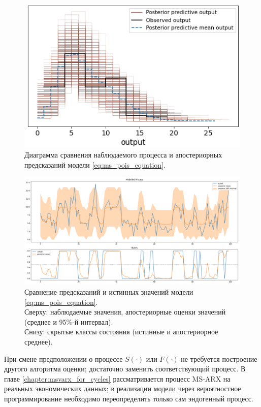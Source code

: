 \documentclass[a4paper,14pt]{extreport}
\begin{document}
\begin{figure}[H]
	\includegraphics[width=\linewidth]{img/gen/pp_ms_pois_ppc.png}
	\caption{
		Диаграмма сравнения наблюдаемого процесса и апостериорных предсказаний модели \eqref{eq:ms_pois_equation}.
	}
	\label{fig:pp_ms_pois_ppc}
\end{figure}

\begin{figure}[H]
	\includegraphics[width=\linewidth]{img/gen/pp_ms_pois_fit.png}
	\caption{Сравнение предсказаний и истинных значений модели \eqref{eq:ms_pois_equation}. \\
		Сверху: наблюдаемые значения, апостериорные оценки значений (среднее и 95\%-й интервал). \\
		Снизу: скрытые классы состояния (истинные и апостериорное среднее).
	}
	\label{fig:pp_ms_pois_fit}
\end{figure}

При смене предположении о процессе $S(\cdot)$ или $F(\cdot)$ не требуется построение другого алгоритма оценки; достаточно заменить соответствующий процесс. В главе \ref{chapter:msvarx_for_cycles} рассматривается процесс MS-ARX на реальных экономических данных; в реализации модели через вероятностное программирование необходимо переопределить только сам эндогенный процесс.
\end{document}
